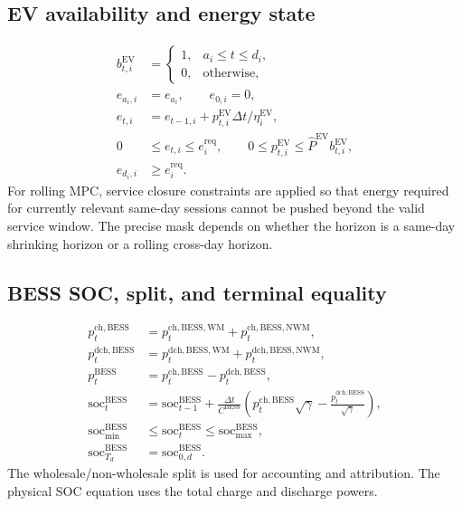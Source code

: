 \documentclass[final,5p,times]{elsarticle}
\newcommand{\DeltaT}{\Delta t}
\newcommand{\EV}{\mathrm{EV}}
\newcommand{\BESS}{\mathrm{BESS}}
\newcommand{\soc}{\mathrm{soc}}
\newcommand{\WM}{\mathrm{WM}}
\newcommand{\NWM}{\mathrm{NWM}}
\newcommand{\ch}{\mathrm{ch}}
\newcommand{\dch}{\mathrm{dch}}
\newcommand{\req}{\mathrm{req}}
\begin{document}
\subsection{EV availability and energy state}
\begin{align}
b_{t,i}^{\EV} &= \begin{cases}1, & a_i\le t\le d_i,\\0, & \text{otherwise},\end{cases}\label{eq:app_ev_avail}\\
e_{a_i,i} &= e_{a_i},\qquad e_{0,i}=0,\label{eq:app_ev_init}\\
e_{t,i} &= e_{t-1,i}+p_{t,i}^{\EV}\DeltaT/\eta_i^{\EV},\label{eq:app_ev_dyn}\\
0&\le e_{t,i}\le e_i^{\req},\qquad
0\le p_{t,i}^{\EV}\le \hat P^{\EV}b_{t,i}^{\EV},\label{eq:app_ev_bounds}\\
e_{d_i,i}&\ge e_i^{\req}.\label{eq:app_ev_req}
\end{align}
For rolling MPC, service closure constraints are applied so that energy required for currently relevant same-day sessions cannot be pushed beyond the valid service window. The precise mask depends on whether the horizon is a same-day shrinking horizon or a rolling cross-day horizon.

\subsection{BESS SOC, split, and terminal equality}
\begin{align}
p_t^{\ch,\BESS}&=p_t^{\ch,\BESS,\WM}+p_t^{\ch,\BESS,\NWM},\label{eq:app_bess_chsplit}\\
p_t^{\dch,\BESS}&=p_t^{\dch,\BESS,\WM}+p_t^{\dch,\BESS,\NWM},\label{eq:app_bess_dchsplit}\\
p_t^{\BESS}&=p_t^{\ch,\BESS}-p_t^{\dch,\BESS},\label{eq:app_bess_power}\\
\soc_t^{\BESS}&=\soc_{t-1}^{\BESS}+\frac{\DeltaT}{C^{\BESS}}
\left(p_t^{\ch,\BESS}\sqrt{\gamma}-\frac{p_t^{\dch,\BESS}}{\sqrt{\gamma}}\right),\label{eq:app_bess_soc}\\
\soc_{\min}^{\BESS}&\le \soc_t^{\BESS}\le \soc_{\max}^{\BESS},\label{eq:app_bess_bounds}\\
\soc_{T_d}^{\BESS}&=\soc_{0,d}^{\BESS}.\label{eq:app_bess_terminal}
\end{align}
The wholesale/non-wholesale split is used for accounting and attribution. The physical SOC equation uses the total charge and discharge powers.
\end{document}
